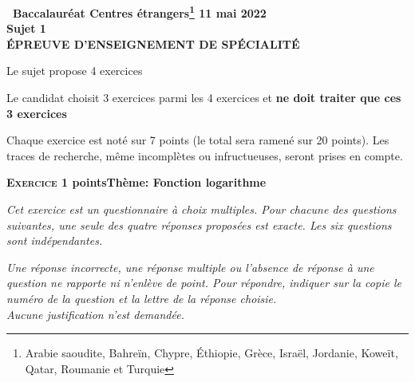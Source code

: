 \documentclass[11pt,a4paper,french]{article}
\begin{document}
\setlength\parindent{0mm}
\pagestyle{fancy}
\thispagestyle{empty}

\begin{center}{\Large\textbf{\decofourleft~Baccalauréat Centres étrangers\footnote{Arabie saoudite, Bahreïn, Chypre, Éthiopie, Grèce, Israël, Jordanie, Koweït, Qatar, Roumanie et Turquie} 11 mai 2022~\decofourright\\[7pt]  Sujet 1\\[7pt] ÉPREUVE D'ENSEIGNEMENT DE SPÉCIALITÉ}}
\end{center}

\vspace{0,25cm}

Le sujet propose 4 exercices

Le candidat choisit 3 exercices parmi les 4 exercices et \textbf{ne doit traiter que ces 3 exercices}

Chaque exercice est noté sur 7 points (le total sera ramené sur 20 points).
Les traces de recherche, même incomplètes ou infructueuses, seront prises en compte.

\bigskip

\textbf{\textsc{Exercice 1}  points\hfill Thème: Fonction logarithme }

\medskip

\emph{Cet exercice est un questionnaire à choix multiples. Pour chacune des questions suivantes, une seule des quatre réponses proposées est exacte. Les six questions sont indépendantes.}

\smallskip

\emph{Une réponse incorrecte, une réponse multiple ou l'absence de réponse à une question ne rapporte ni n'enlève de point. Pour répondre, indiquer sur la copie le numéro de la question et la lettre de la réponse choisie. \\
Aucune justification n'est demandée.}

\medskip
\end{document}
